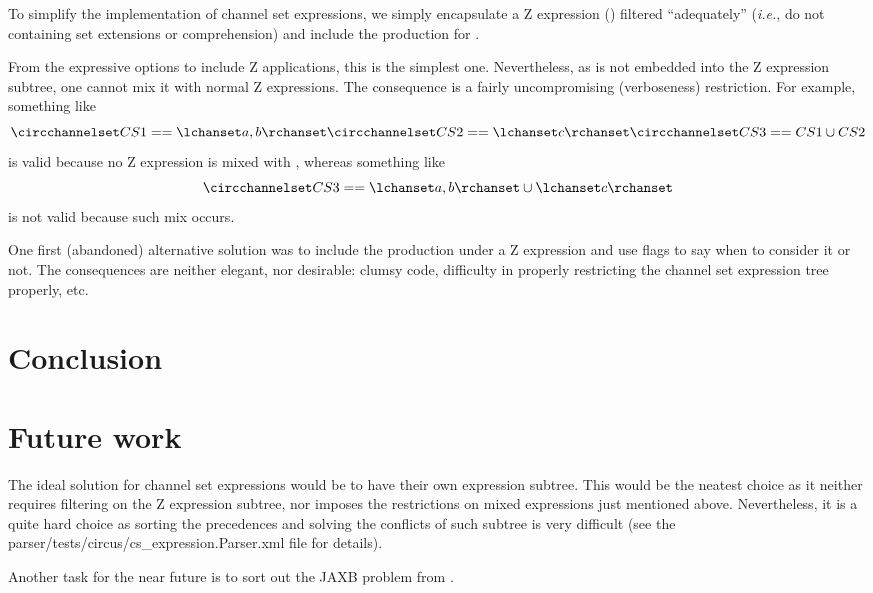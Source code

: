 \documentclass{article}
\begin{document}
\begin{issue}
    To simplify the implementation of channel set expressions, we simply encapsulate
    a Z expression () filtered ``adequately'' (\textit{i.e.}, do not containing
    set extensions or comprehension) and include the production for .

    From the expressive options to include Z applications, this is the simplest one. Nevertheless,
    as  is not embedded into the Z expression subtree, one cannot mix
    it with normal Z expressions. The consequence is a fairly uncompromising (verboseness) restriction.
    For example, something like
    \[
        \circchannelset CS1 == \lchanset a, b \rchanset \\
        \circchannelset CS2 == \lchanset c \rchanset \\
        \circchannelset CS3 == CS1 \cup CS2
    \]
    is valid because no Z expression is mixed with , whereas something like
    \[
        \circchannelset CS3 == \lchanset a, b \rchanset \cup \lchanset c \rchanset
    \]
    is not valid because such mix occurs.

    One first (abandoned) alternative solution was to include the  production
    under a Z expression and use flags to say when to consider it or not. The consequences are neither
    elegant, nor desirable: clumsy code, difficulty in properly restricting the channel set expression
    tree properly, etc.
\end{issue}

\section{Conclusion}

\section{Future work}

The ideal solution for channel set expressions would be to have their own expression subtree.
This would be the neatest choice as it neither requires filtering on the Z expression subtree,
nor imposes the restrictions on mixed expressions just mentioned above. Nevertheless, it is
a quite hard choice as sorting the precedences and solving the conflicts of such subtree is
very difficult (see the \textsf{parser/tests/circus/cs\_expression.Parser.xml} file for details).

Another task for the near future is to sort out the JAXB problem from .
\end{document}

